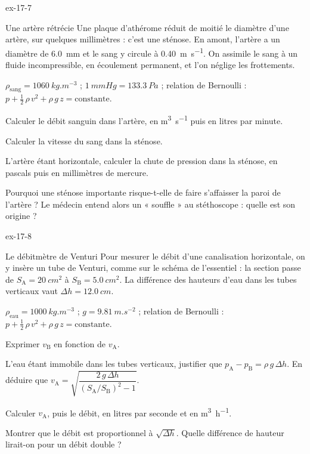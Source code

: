\begin{blocLivre}{ex-17-7}
\begin{exercice}[2]{Une artère rétrécie}
Une plaque d'athérome réduit de moitié le diamètre d'une artère, sur quelques millimètres : c'est une sténose. En
amont, l'artère a un diamètre de \qty{6,0}{mm} et le sang y circule à \qty{0,40}{m.s^{-1}}. On assimile le sang à un fluide
incompressible, en écoulement permanent, et l'on néglige les frottements.
\begin{donnees}
$\rho_\mathrm{sang}=\qty{1060}{kg.m^{-3}}$ ; $\qty{1}{mmHg}=\qty{133,3}{Pa}$ ; relation de Bernoulli :
$p+\frac12\,\rho\,v^2+\rho\,g\,z=\text{constante}$.
\end{donnees}
\begin{questions}
\item Calculer le débit sanguin dans l'artère, en \unit{m^3.s^{-1}} puis en litres par minute.
\item Calculer la vitesse du sang dans la sténose.
\item L'artère étant horizontale, calculer la chute de pression dans la sténose, en pascals puis en millimètres de
mercure.
\item Pourquoi une sténose importante risque-t-elle de faire s'affaisser la paroi de l'artère ? Le médecin entend alors
un « souffle » au stéthoscope : quelle est son origine ?
\end{questions}
\end{exercice}
\end{blocLivre}
\begin{blocLivre}{ex-17-8}
\begin{exercice}[2]{Le débitmètre de Venturi}
Pour mesurer le débit d'une canalisation horizontale, on y insère un tube de Venturi, comme sur le schéma de
l'essentiel : la section passe de $S_\mathrm{A}=\qty{20}{cm^2}$ à $S_\mathrm{B}=\qty{5,0}{cm^2}$. La différence des hauteurs
d'eau dans les tubes verticaux vaut $\Delta h=\qty{12,0}{cm}$.
\begin{donnees}
$\rho_\mathrm{eau}=\qty{1000}{kg.m^{-3}}$ ; $g=\qty{9,81}{m.s^{-2}}$ ; relation de Bernoulli :
$p+\frac12\,\rho\,v^2+\rho\,g\,z=\text{constante}$.
\end{donnees}
\begin{questions}
\item Exprimer $v_\mathrm{B}$ en fonction de $v_\mathrm{A}$.
\item L'eau étant immobile dans les tubes verticaux, justifier que $p_\mathrm{A}-p_\mathrm{B}=\rho\,g\,\Delta h$. En
déduire que $v_\mathrm{A}=\sqrt{\dfrac{2\,g\,\Delta h}{(S_\mathrm{A}/S_\mathrm{B})^2-1}}$.
\item Calculer $v_\mathrm{A}$, puis le débit, en litres par seconde et en \unit{m^3.h^{-1}}.
\item Montrer que le débit est proportionnel à $\sqrt{\Delta h}$. Quelle différence de hauteur lirait-on pour un débit
double ?
\end{questions}
\end{exercice}
\end{blocLivre}
